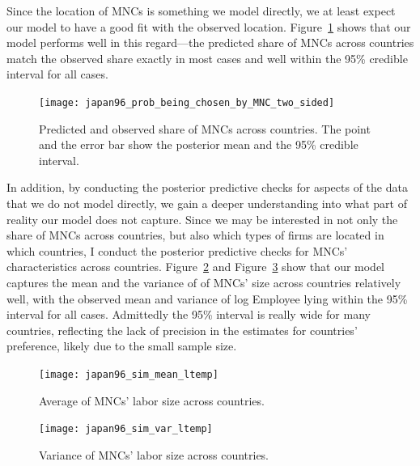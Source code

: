 Since the location of MNCs is something we model directly, we at least
expect our model to have a good fit with the observed location.
Figure~\ref{fig:japan96_prob_being_chosen_by_MNC_two_sided} shows that our model
performs well in this regard---the predicted share of MNCs across countries
match the observed share exactly in most cases and well within the 95\% credible
interval for all cases. 

\begin{figure}[!ht] \centering
\texttt{[image: japan96\_prob\_being\_chosen\_by\_MNC\_two\_sided]}
  \caption[Predicted and observed MNCs' distribution across Asia.]{Predicted and
    observed share of MNCs across countries. The point and the error
bar show the posterior mean and the 95\% credible interval.}
  \label{fig:japan96_prob_being_chosen_by_MNC_two_sided}
\end{figure}

In addition, by conducting the posterior predictive checks for aspects of the
data that we do not model directly, we gain a deeper understanding into what
part of reality our model does not capture. Since we may be interested in
not only the share of MNCs across countries, but also which types of firms are
located in which countries, I conduct the posterior predictive checks for MNCs'
characteristics across countries. Figure~\ref{fig:japan96_sim_mean_ltemp} and
Figure~\ref{fig:japan96_sim_var_ltemp} show that our model captures the mean
and the variance of of MNCs' size across countries relatively well, with the
observed mean and variance of log Employee lying within the 95\% interval for all cases.
Admittedly the 95\% interval is really wide for many countries, reflecting the
lack of precision in the estimates for countries' preference, likely due to the
small sample size.

\begin{figure}[!ht] \centering
\texttt{[image: japan96\_sim\_mean\_ltemp]}
  \caption[Predicted and observed MNCs' size across countries.]{Average of MNCs' labor size across countries.}
  \label{fig:japan96_sim_mean_ltemp}
\end{figure}

\begin{figure}[!ht] \centering
\texttt{[image: japan96\_sim\_var\_ltemp]}
  \caption[Predicted and observed variance of MNCs' size across countries.]{Variance of MNCs' labor size across countries.}
  \label{fig:japan96_sim_var_ltemp}
\end{figure}

